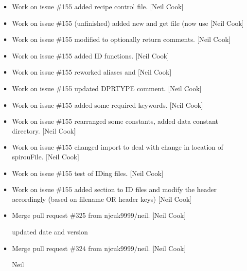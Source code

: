 \documentclass[a4paper,10pt,english]{report}
\begin{document}
\label{\detokenize{misc/changelog:id442}}\begin{itemize}
\item {} 
Work on issue \#155 \sphinxhyphen{} added recipe control file. {[}Neil Cook{]}

\item {} 
Work on issue \#155 \sphinxhyphen{} (un\sphinxhyphen{}finished) added new  and
get file (now use  {[}Neil Cook{]}

\item {} 
Work on issue \#155 \sphinxhyphen{} modified  to optionally return
comments. {[}Neil Cook{]}

\item {} 
Work on issue \#155 \sphinxhyphen{} added ID functions. {[}Neil Cook{]}

\item {} 
Work on issue \#155 \sphinxhyphen{} reworked aliases and  {[}Neil Cook{]}

\item {} 
Work on issue \#155 \sphinxhyphen{} updated DPRTYPE comment. {[}Neil Cook{]}

\item {} 
Work on issue \#155 \sphinxhyphen{} added some required keywords. {[}Neil Cook{]}

\item {} 
Work on issue \#155 \sphinxhyphen{} rearranged some constants, added data constant
directory. {[}Neil Cook{]}

\item {} 
Work on issue \#155 \sphinxhyphen{} changed import to deal with change in location of
spirouFile. {[}Neil Cook{]}

\item {} 
Work on issue \#155 \sphinxhyphen{} test of ID\sphinxhyphen{}ing files. {[}Neil Cook{]}

\item {} 
Work on issue \#155 \sphinxhyphen{} added section to ID files and modify the header
accordingly (based on filename OR header keys) {[}Neil Cook{]}

\item {} 
Merge pull request \#325 from njcuk9999/neil. {[}Neil Cook{]}

updated date and version

\item {} 
Merge pull request \#324 from njcuk9999/neil. {[}Neil Cook{]}

Neil

\end{itemize}
\end{document}
